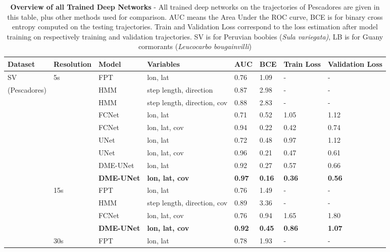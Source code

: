 \documentclass{article}
\begin{document}
\begin{table}[h]
 \caption{\textbf{Overview of all Trained Deep Networks} - All trained deep networks on the trajectories of Pescadores are given in this table, plus other methods used for comparison. AUC means the Area Under the ROC curve, BCE is for binary cross entropy computed on the testing trajectories. Train and Validation Loss correspond to the loss estimation after model training on respectively training and validation trajectories. SV is for Peruvian boobies (\textit{Sula variegata)}, LB is for Guany cormorants (\textit{Leucocarbo bougainvilli})}
  \centering
  \begin{tabular}{llllllll}
    \toprule
    Dataset  &  Resolution &  Model & Variables & AUC & BCE & Train Loss & Validation Loss \\
    \midrule
    SV       & 5s  & FPT    & lon, lat               & 0.76 & 1.09 & - & -     \\
(Pescadores) &     & HMM    & step length, direction & 0.87 & 2.98 & - & -     \\
            &     & HMM    & step length, direction, cov & 0.88 & 2.83 & - & - \\
             &     & FCNet  & lon, lat               & 0.71 & 0.52 & 1.05 & 1.12 \\
             &     & FCNet  & lon, lat, cov          & 0.94 & 0.22 & 0.42 & 0.74  \\
             &     & UNet   & lon, lat               & 0.72 & 0.48 & 0.97 & 1.12  \\
             &     & UNet   & lon, lat, cov          & 0.96 & 0.21 & 0.47 & 0.61  \\
             &     & DME-UNet   & lon, lat   & 0.92 & 0.27 & 0.57 & 0.66  \\
             &     & \textbf{DME-UNet}   & \textbf{lon, lat, cov}  & \textbf{0.97} & \textbf{0.16} & \textbf{0.36} & \textbf{0.56}  \\
             & 15s & FPT    & lon, lat               & 0.76 & 1.49 & - & -      \\
             &     & HMM    & step length, direction, cov & 0.89 & 3.36 & - & -       \\
             &     & FCNet  & lon, lat, cov          & 0.76 & 0.94 & 1.65 & 1.80 \\
             &     & \textbf{DME-UNet}   & \textbf{lon, lat, cov}  & \textbf{0.92} & \textbf{0.45} & \textbf{0.86} & \textbf{1.07}  \\
             & 30s & FPT    & lon, lat               & 0.78 & 1.93 & - & -      \\

\end{tabular}
\end{table}
\end{document}

